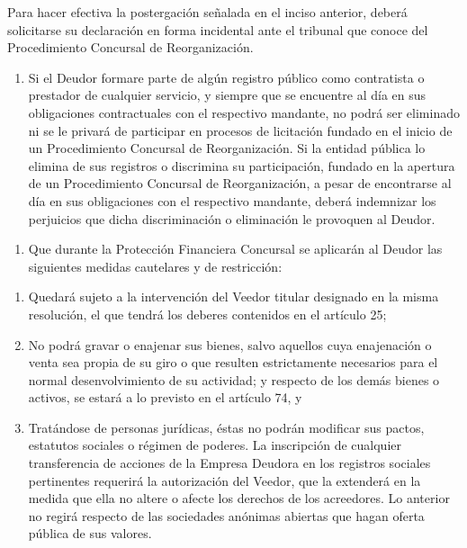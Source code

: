\documentclass[
]{book}
\providecommand{\tightlist}{%
  \setlength{\itemsep}{0pt}\setlength{\parskip}{0pt}}
\begin{document}
Para hacer efectiva la postergación señalada en el inciso anterior, deberá solicitarse su declaración en forma incidental ante el tribunal que conoce del Procedimiento Concursal de Reorganización.

\begin{enumerate}
\def\labelenumi{\alph{enumi})}
\setcounter{enumi}{3}
\tightlist
\item
  Si el Deudor formare parte de algún registro público como contratista o prestador de cualquier servicio, y siempre que se encuentre al día en sus obligaciones contractuales con el respectivo mandante, no podrá ser eliminado ni se le privará de participar en procesos de licitación fundado en el inicio de un Procedimiento Concursal de Reorganización. Si la entidad pública lo elimina de sus registros o discrimina su participación, fundado en la apertura de un Procedimiento Concursal de Reorganización, a pesar de encontrarse al día en sus obligaciones con el respectivo mandante, deberá indemnizar los perjuicios que dicha discriminación o eliminación le provoquen al Deudor.
\end{enumerate}

\begin{enumerate}
\def\labelenumi{\arabic{enumi})}
\setcounter{enumi}{1}
\tightlist
\item
  Que durante la Protección Financiera Concursal se aplicarán al Deudor las siguientes medidas cautelares y de restricción:
\end{enumerate}

\begin{enumerate}
\def\labelenumi{\alph{enumi})}
\item
  Quedará sujeto a la intervención del Veedor titular designado en la misma resolución, el que tendrá los deberes contenidos en el artículo 25;
\item
  No podrá gravar o enajenar sus bienes, salvo aquellos cuya enajenación o venta sea propia de su giro o que resulten estrictamente necesarios para el normal desenvolvimiento de su actividad; y respecto de los demás bienes o activos, se estará a lo previsto en el artículo 74, y
\item
  Tratándose de personas jurídicas, éstas no podrán modificar sus pactos, estatutos sociales o régimen de poderes. La inscripción de cualquier transferencia de acciones de la Empresa Deudora en los registros sociales pertinentes requerirá la autorización del Veedor, que la extenderá en la medida que ella no altere o afecte los derechos de los acreedores. Lo anterior no regirá respecto de las sociedades anónimas abiertas que hagan oferta pública de sus valores.
\end{enumerate}
\end{document}
